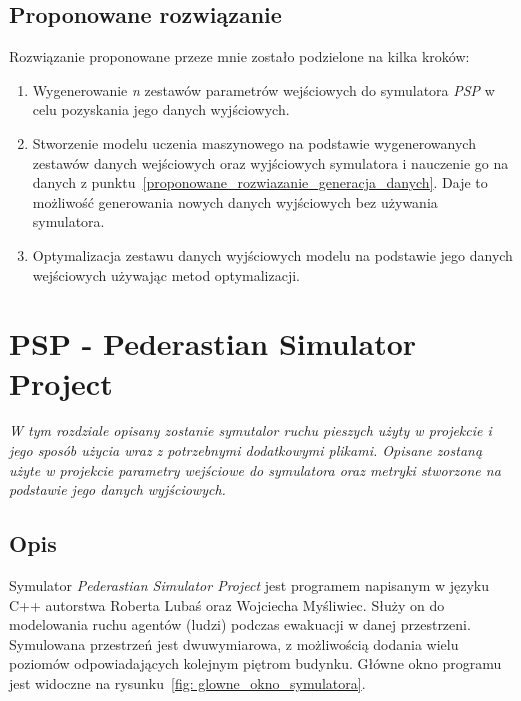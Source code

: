 \documentclass[12pt]{aghdpl}
\begin{document}
		\section{Proponowane rozwiązanie}
		Rozwiązanie proponowane przeze mnie zostało podzielone na kilka kroków:
		\begin{enumerate}
		\item\label{proponowane_rozwiazanie_generacja_danych} Wygenerowanie \textit{n} zestawów parametrów wejściowych do symulatora \textit{PSP} w celu pozyskania jego danych wyjściowych.
		\item Stworzenie modelu uczenia maszynowego na podstawie wygenerowanych zestawów danych wejściowych oraz wyjściowych symulatora i nauczenie go na danych z punktu~\ref{proponowane_rozwiazanie_generacja_danych}. Daje to możliwość generowania nowych danych wyjściowych bez używania symulatora.
		\item Optymalizacja zestawu danych wyjściowych modelu na podstawie jego danych wejściowych używając metod optymalizacji.
		\end{enumerate}
	
	\newpage
	\chapter{PSP - Pederastian Simulator Project}\label{sekcja_psp}
	\textit{W tym rozdziale opisany zostanie symutalor ruchu pieszych użyty w projekcie i jego sposób użycia wraz z potrzebnymi dodatkowymi plikami. Opisane zostaną użyte w projekcie parametry wejściowe do symulatora oraz metryki stworzone na podstawie jego danych wyjściowych.}
	
		\section{Opis}
		Symulator \textit{Pederastian Simulator Project} jest programem napisanym w języku C++ autorstwa Roberta Lubaś oraz Wojciecha Myśliwiec. Służy on do modelowania ruchu agentów (ludzi) podczas ewakuacji w danej przestrzeni. Symulowana przestrzeń jest dwuwymiarowa, z możliwością dodania wielu poziomów odpowiadających kolejnym piętrom budynku. Główne okno programu jest widoczne na rysunku~\ref{fig: glowne_okno_symulatora}.
	
\end{document}
